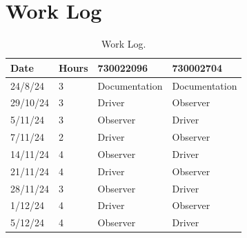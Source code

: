 \documentclass{article}
\begin{document}
\section{Work Log}
\begin{table}[H]
    \centering
    \begin{tabular}{llll}
        \toprule
        \textbf{Date} & \textbf{Hours} & \textbf{730022096} & \textbf{730002704} \\
        \midrule
        24/8/24       & 3              & Documentation      & Documentation      \\
        29/10/24      & 3              & Driver             & Observer           \\
        5/11/24       & 3              & Observer           & Driver             \\
        7/11/24       & 2              & Driver             & Observer           \\
        14/11/24      & 4              & Observer           & Driver             \\
        21/11/24      & 4              & Driver             & Observer           \\
        28/11/24      & 3              & Observer           & Driver             \\
        1/12/24       & 4              & Driver             & Observer           \\
        5/12/24       & 4              & Observer           & Driver             \\
        \bottomrule
    \end{tabular}
    \caption{Work Log.}
    \label{tab:work-log}
\end{table}
\end{document}
